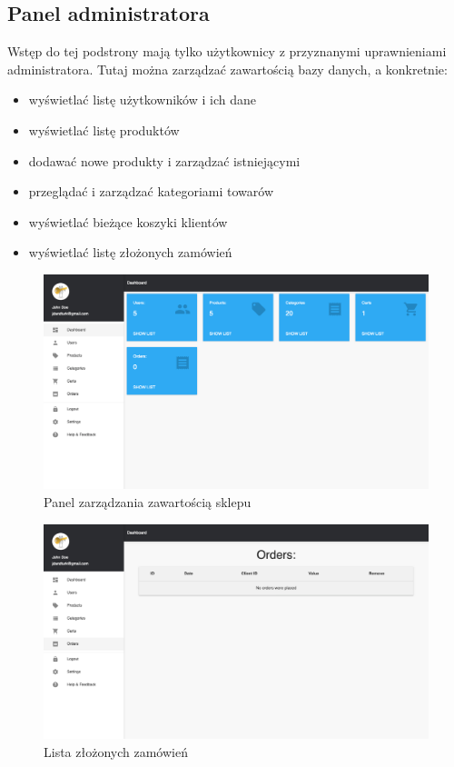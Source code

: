 \documentclass[12pt,a4paper,titlepage]{article}
\begin{document}
\subsection{Panel administratora}
Wstęp do tej podstrony mają tylko użytkownicy z przyznanymi uprawnieniami administratora. Tutaj można zarządzać zawartością bazy danych, a konkretnie:
\begin{itemize}
    \item wyświetlać listę użytkowników i ich dane
    \item wyświetlać listę produktów
    \item dodawać nowe produkty i zarządzać istniejącymi
    \item przeglądać i zarządzać kategoriami towarów
    \item wyświetlać bieżące koszyki klientów
    \item wyświetlać listę złożonych zamówień
\end{itemize}
\begin{figure}[H]
    \centering
    \includegraphics[width=15cm]{Pics/adminPanel1.png}
    \caption{Panel zarządzania zawartością sklepu}
    \label{pic:adminPanel1}
\end{figure}
\begin{figure}[H]
    \centering
    \includegraphics[width=15cm]{Pics/adminPanel2.png}
    \caption{Lista złożonych zamówień}
    \label{pic:adminPanel2}
\end{figure}
\end{document}
